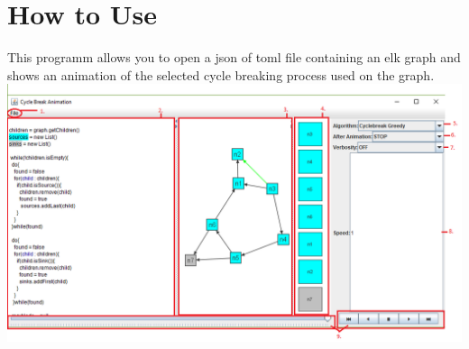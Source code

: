 \section{How to Use}
This programm allows you to open a json of toml file containing an elk graph and shows an animation of the selected cycle breaking process used on the graph.
\includegraphics[width=\textwidth]{parts/InterfaceV2_1}

